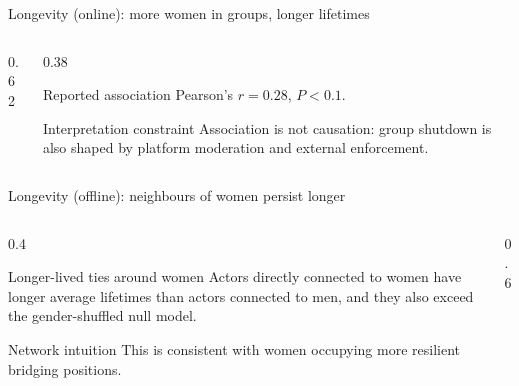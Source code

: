 \begin{frame}{Longevity (online): more women in groups, longer lifetimes}
  \small
  \begin{columns}[T,onlytextwidth]
    \begin{column}{0.62\textwidth}
    \end{column}

    \begin{column}{0.38\textwidth}
      \begin{block}{Reported association}
        Pearson's $r = 0.28$, $P < 0.1$.
      \end{block}

      \begin{exampleblock}{Interpretation constraint}
        Association is not causation: group shutdown is also shaped by platform moderation and external enforcement.
      \end{exampleblock}
    \end{column}
  \end{columns}

\end{frame}

\begin{frame}{Longevity (offline): neighbours of women persist longer}
  \small
  \begin{columns}[T,onlytextwidth]
    \begin{column}{0.4\textwidth}
      \begin{block}{Longer-lived ties around women}
        Actors directly connected to women have longer average lifetimes than actors connected to men, and they also exceed the gender-shuffled null model.
      \end{block}

      \begin{exampleblock}{Network intuition}
        This is consistent with women occupying more resilient bridging positions.
      \end{exampleblock}
    \end{column}

    \begin{column}{0.6\textwidth}
    \end{column}
  \end{columns}

\end{frame}
